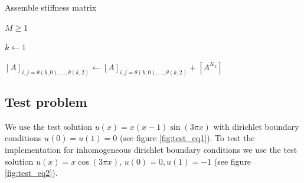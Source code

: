 \begin{algorithm}
\caption{Assemble stiffness matrix}\label{alg:assemble_stiffness_matrix}
\begin{algorithmic}
\Require $M \geq 1$

\State $k \gets 1$

\State $[A]_{i, j=\theta(k, 0), \dots, \theta(k, 2)}
\gets [A]_{i, j=\theta(k, 0), \dots, \theta(k, 2)} + [A^{K_k}]$
\EndFor


\end{algorithmic}
\end{algorithm}

\subsection{Test problem}

We use the test solution \( u(x) = x(x-1)\sin(3\pi x) \)
with dirichlet boundary conditions \( u(0) = u(1) = 0 \)
(see figure \ref{fig:test_eq1}).
To test the implementation for inhomogeneous dirichlet boundary conditions
we use the test solution \( u(x) = x \cos(3\pi x) \), \( u(0) = 0, u(1) = -1 \)
(see figure \ref{fig:test_eq2}).

